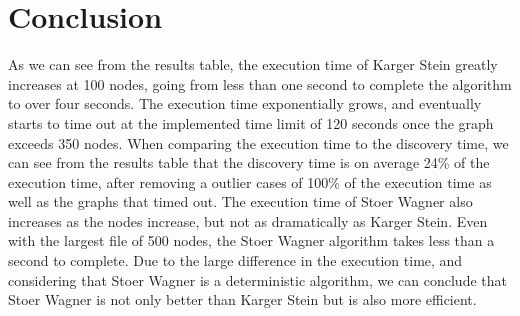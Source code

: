 \section{Conclusion}
As we can see from the results table, the execution time of Karger Stein greatly increases at 100 nodes, going from less than one second to complete the algorithm to over four seconds. The execution time exponentially grows, and eventually starts to time out at the implemented time limit of 120 seconds once the graph exceeds 350 nodes. When comparing the execution time to the discovery time, we can see from the results table that the discovery time is on average 24\% of the execution time, after removing a outlier cases of 100\% of the execution time as well as the graphs that timed out. The execution time of Stoer Wagner also increases as the nodes increase, but not as dramatically as Karger Stein. Even with the largest file of 500 nodes, the Stoer Wagner algorithm takes less than a second to complete. Due to the large difference in the execution time, and considering that Stoer Wagner is a deterministic algorithm, we can conclude that Stoer Wagner is not only better than Karger Stein but is also more efficient. 

\pagebreak
